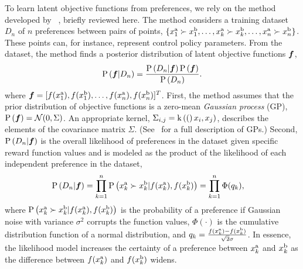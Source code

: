To learn latent objective functions from preferences, we rely on the method
developed by \citeauthor{chu2005preference}~\citep{chu2005preference}, briefly
reviewed here.  The method considers a training dataset $D_n$ of $n$ preferences
between pairs of points, $\{x_1^{\mathrm{a}} \succ x_1^{\mathrm{b}}, \ldots, x_k^{\mathrm{a}}
\succ x_k^{\mathrm{b}}, \ldots, x_n^{\mathrm{a}} \succ x_n^{\mathrm{b}}\}$. These points can, for
instance, represent control policy parameters. From the dataset, the method
finds a posterior distribution of latent objective functions $\vecf{f}$,
\begin{align}
    \prob{\vecf{f}|D_n} = \frac{\prob{D_n|\vecf{f}}
        \prob{\vecf{f}}}{\prob{D_n}}.
    \label{eq:bayes_rule}
\end{align}
where $\vecf{f} = [f(x_1^\tn{a}), f(x_1^\tn{b}), \ldots, f(x_n^\tn{a}),
f(x_n^\tn{b})]^T$. First, the method assumes that the prior distribution of
objective functions is a zero-mean \emph{Gaussian process} (GP),
$\prob{\vecf{f}} = \mathcal{N}(0, \Sigma)$. An appropriate kernel, $\Sigma_{i,j}
= \func{k}(x_i,x_j)$, describes the elements of the covariance matrix $\Sigma$.
(See~\citep{williams2006gaussian} for a full description of GPs.) Second,
$\prob{D_n|\vecf{f}}$ is the overall likelihood of preferences in the
dataset given specific reward function values and is modeled as the product of
the likelihood of each independent preference in the dataset,
\begin{align}
    \prob{D_n|\vecf{f}} &= \prod_{k=1}^n \prob{x_k^\tn{a} \succ x_k^\tn{b} 
            | f(x_k^\tn{a}), f(x_k^\tn{b})} 
        = \prod_{k=1}^n \Phi(q_k),
    \label{eq:likelihood}
\end{align}
where $\operatorname{P} \left( x_k^{\mathrm{a}} \succ x_k^{\mathrm{b}} | f(x_k^{\mathrm{a}}), f(x_k^{\mathrm{b}}) \right)$ is the
probability of a preference if Gaussian noise with variance $\sigma^2$ corrupts
the function values, $\Phi(\cdot)$ is the cumulative distribution function of a
normal distribution, and $q_k = \frac{f(x_k^{\mathrm{a}}) - f(x_k^{\mathrm{b}})}{\sqrt{2}
\sigma}$.  In essence, the likelihood model increases the certainty of a
preference between $x_k^{\mathrm{a}}$ and $x_k^{\mathrm{b}}$ as the difference between
$f(x_k^{\mathrm{a}})$ and $f(x_k^{\mathrm{b}})$ widens. 


